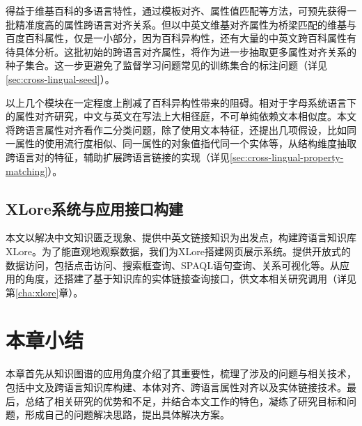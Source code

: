 得益于维基百科的多语言特性，通过模板对齐、属性值匹配等方法，可预先获得一批精准度高的属性跨语言对齐关系。但以中英文维基对齐属性为桥梁匹配的维基与百度百科属性，仅是一小部分，因为百科异构性，还有大量的中英文跨百科属性有待具体分析。这批初始的跨语言对齐属性，将作为进一步抽取更多属性对齐关系的种子集合。这一步更避免了监督学习问题常见的训练集合的标注问题（详见\ref{sec:cross-lingual-seed}）。

以上几个模块在一定程度上削减了百科异构性带来的阻碍。相对于字母系统语言下的属性对齐研究，中文与英文在写法上大相径庭，不可单纯依赖文本相似度。本文将跨语言属性对齐看作二分类问题，除了使用文本特征，还提出几项假设，比如同一属性的使用流行度相似、同一属性的对象值指代同一个实体等，从结构维度抽取跨语言对的特征，辅助扩展跨语言链接的实现（详见\ref{sec:cross-lingual-property-matching}）。

\subsection{XLore系统与应用接口构建}
本文以解决中文知识匮乏现象、提供中英文链接知识为出发点，构建跨语言知识库XLore。为了能直观地观察数据，我们为XLore搭建网页展示系统。提供开放式的数据访问，包括点击访问、搜索框查询、SPAQL语句查询、关系可视化等。从应用的角度，还搭建了基于知识库的实体链接查询接口，供文本相关研究调用（详见第\ref{cha:xlore}章）。

\section{本章小结}
本章首先从知识图谱的应用角度介绍了其重要性，梳理了涉及的问题与相关技术，包括中文及跨语言知识库构建、本体对齐、跨语言属性对齐以及实体链接技术。最后，总结了相关研究的优势和不足，并结合本文工作的特色，凝练了研究目标和问题，形成自己的问题解决思路，提出具体解决方案。
